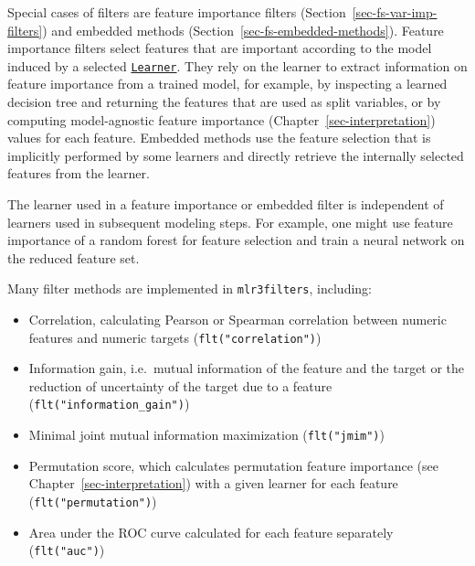 Special cases of filters are feature
importance filters
(Section~\ref{sec-fs-var-imp-filters}) and embedded methods
(Section~\ref{sec-fs-embedded-methods}). Feature importance filters
select features that are important according to the model induced by a
selected
\href{https://mlr3.mlr-org.com/reference/Learner.html}{\texttt{Learner}}.
They rely on the learner to extract information on feature importance
from a trained model, for example, by inspecting a learned decision tree
and returning the features that are used as split variables, or by
computing model-agnostic feature importance
(Chapter~\ref{sec-interpretation}) values for each feature. Embedded
methods use the feature selection that is implicitly performed by some
learners and directly retrieve the internally selected features from the
learner.

\begin{tcolorbox}[enhanced jigsaw, opacitybacktitle=0.6, rightrule=.15mm, opacityback=0, arc=.35mm, breakable, titlerule=0mm, colframe=quarto-callout-tip-color-frame, coltitle=black, bottomrule=.15mm, toprule=.15mm, colback=white, colbacktitle=quarto-callout-tip-color!10!white, bottomtitle=1mm, toptitle=1mm, title=\textcolor{quarto-callout-tip-color}{\faLightbulb}\hspace{0.5em}{Independent Learners and Filters}, leftrule=.75mm, left=2mm]

The learner used in a feature importance or embedded filter is
independent of learners used in subsequent modeling steps. For example,
one might use feature importance of a random forest for feature
selection and train a neural network on the reduced feature set.

\end{tcolorbox}

Many filter methods are implemented in \texttt{mlr3filters}, including:

\begin{itemize}
\tightlist
\item
  Correlation, calculating Pearson or Spearman correlation between
  numeric features and numeric targets (\texttt{flt("correlation")})
\item
  Information gain, i.e.~mutual information of the feature and the
  target or the reduction of uncertainty of the target due to a feature
  (\texttt{flt("information\_gain")})
\item
  Minimal joint mutual information maximization (\texttt{flt("jmim")})
\item
  Permutation score, which calculates permutation feature importance
  (see Chapter~\ref{sec-interpretation}) with a given learner for each
  feature (\texttt{flt("permutation")})
\item
  Area under the ROC curve calculated for each feature separately
  (\texttt{flt("auc")})
\end{itemize}

